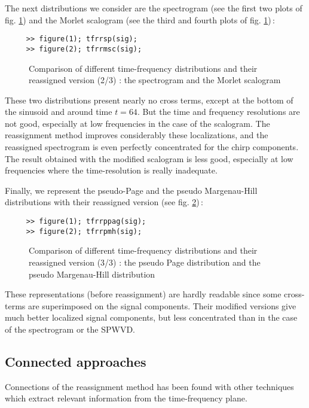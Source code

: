 The next distributions we consider are the spectrogram (see the first two
plots of fig. \ref{Re1fig3}) and the Morlet scalogram (see the third and
fourth plots of fig. \ref{Re1fig3})\,:
\begin{verbatim}
     >> figure(1); tfrrsp(sig);
     >> figure(2); tfrrmsc(sig);
\end{verbatim}
\begin{figure}[htb]
\epsfxsize=12cm
\epsfysize=12cm
\centerline{}
\caption{\label{Re1fig3}Comparison of different time-frequency
distributions and their reassigned version (2/3) : the spectrogram and the
Morlet scalogram}
\end{figure}
These two distributions present nearly no cross terms, except at
the bottom of the sinusoid and around time $t=64$. But the time and
frequency resolutions are not good, especially at low frequencies in the
case of the scalogram. The reassignment method improves considerably these
localizations, and the reassigned spectrogram is even perfectly
concentrated for the chirp components. The result obtained with the
modified scalogram is less good, especially at low frequencies where the
time-resolution is really inadequate. 

Finally, we represent the pseudo-Page and the pseudo Margenau-Hill
distributions with their reassigned version (see fig. \ref{Re1fig4})\,:  
\begin{verbatim}
     >> figure(1); tfrrppag(sig);
     >> figure(2); tfrrpmh(sig);
\end{verbatim}
\begin{figure}[htb]
\epsfxsize=12cm
\epsfysize=12cm
\centerline{}
\caption{\label{Re1fig4}Comparison of different time-frequency
distributions and their reassigned version (3/3) : the pseudo Page
distribution and the pseudo Margenau-Hill distribution}
\end{figure}
These representations (before reassignment) are hardly readable since some
cross-terms are superimposed on the signal components. Their modified
versions give much better localized signal components, but less
concentrated than in the case of the spectrogram or the SPWVD.


\subsection{Connected approaches}
  Connections of the reassignment method has been found with other
techniques which extract relevant information from the time-frequency
plane. 

